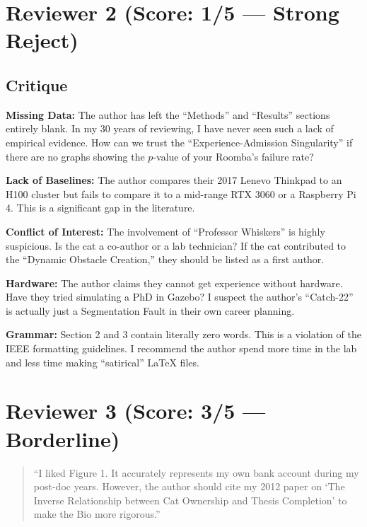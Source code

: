 \documentclass[letterpaper]{article}
\begin{document}
\section*{Reviewer 2 (Score: 1/5 --- Strong Reject)}

\subsection*{Critique}

\textbf{Missing Data:} The author has left the ``Methods'' and ``Results'' sections entirely blank. In my 30 years of reviewing, I have never seen such a lack of empirical evidence. How can we trust the ``Experience-Admission Singularity'' if there are no graphs showing the $p$-value of your Roomba’s failure rate?

\vspace{0.5em}

\textbf{Lack of Baselines:} The author compares their 2017 Lenevo Thinkpad to an H100 cluster but fails to compare it to a mid-range RTX 3060 or a Raspberry Pi 4. This is a significant gap in the literature.

\vspace{0.5em}

\textbf{Conflict of Interest:} The involvement of ``Professor Whiskers'' is highly suspicious. Is the cat a co-author or a lab technician? If the cat contributed to the ``Dynamic Obstacle Creation,'' they should be listed as a first author.

\vspace{0.5em}

\textbf{Hardware:} The author claims they cannot get experience without hardware. Have they tried simulating a PhD in Gazebo? I suspect the author’s ``Catch-22'' is actually just a Segmentation Fault in their own career planning.

\vspace{0.5em}

\textbf{Grammar:} Section 2 and 3 contain literally zero words. This is a violation of the IEEE formatting guidelines. I recommend the author spend more time in the lab and less time making ``satirical'' LaTeX files.

\section*{Reviewer 3 (Score: 3/5 --- Borderline)}
\begin{quote}
``I liked Figure 1. It accurately represents my own bank account during my post-doc years. However, the author should cite my 2012 paper on `The Inverse Relationship between Cat Ownership and Thesis Completion' to make the Bio more rigorous.''
\end{quote}
\end{document}
